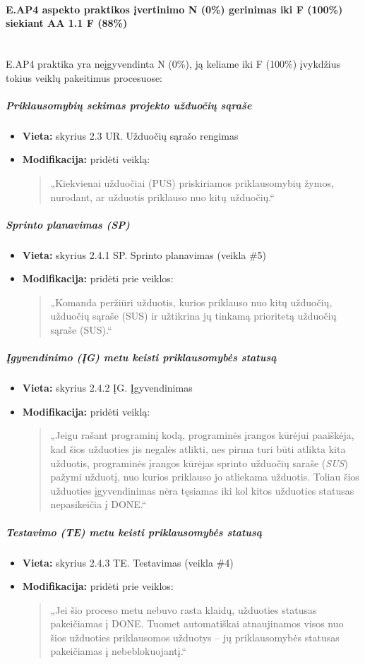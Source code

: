 \documentclass{article}
\newcommand{\subsubsubsection}[1]{\paragraph{#1}\mbox{}\\}
\begin{document}
\subsubsubsection{E.AP4 aspekto praktikos įvertinimo N (0\%) gerinimas iki F (100\%) siekiant AA 1.1 F (88\%)}

E.AP4 praktika yra neįgyvendinta N (0\%), ją keliame iki F (100\%) įvykdžius tokius veiklų pakeitimus procesuose:

\subparagraph{Priklausomybių sekimas projekto užduočių sąraše}
\begin{itemize}
    \item \textbf{Vieta:} skyrius 2.3 UR. Užduočių sąrašo rengimas
    \item \textbf{Modifikacija:} pridėti veiklą:
    \begin{quote}
        „Kiekvienai užduočiai (PUS) priskiriamos priklausomybių žymos, nurodant, ar užduotis priklauso nuo kitų užduočių.“
    \end{quote}
\end{itemize}

\subparagraph{Sprinto planavimas (SP)}
\begin{itemize}
    \item \textbf{Vieta:} skyrius 2.4.1 SP. Sprinto planavimas (veikla \#5)
    \item \textbf{Modifikacija:} pridėti prie veiklos:
    \begin{quote}
        „Komanda peržiūri užduotis, kurios priklauso nuo kitų užduočių, užduočių sąraše (SUS) ir užtikrina jų tinkamą prioritetą užduočių sąraše (SUS).“
    \end{quote}
\end{itemize}

\subparagraph{Įgyvendinimo (ĮG) metu keisti priklausomybės statusą}
\begin{itemize}
    \item \textbf{Vieta:} skyrius 2.4.2 ĮG. Įgyvendinimas
    \item \textbf{Modifikacija:} pridėti veiklą:
    \begin{quote}
        „Jeigu rašant programinį kodą, programinės įrangos kūrėjui paaiškėja, kad šios užduoties jis negalės atlikti, nes pirma turi būti atlikta kita užduotis, programinės įrangos kūrėjas sprinto užduočių saraše (\textit{SUS}) pažymi užduotį, nuo kurios priklauso jo atliekama užduotis. Toliau šios užduoties įgyvendinimas nėra tęsiamas iki kol kitos užduoties statusas nepasikeičia į DONE.“
    \end{quote}
\end{itemize}

\subparagraph{Testavimo (TE) metu keisti priklausomybės statusą}
\begin{itemize}
    \item \textbf{Vieta:} skyrius 2.4.3 TE. Testavimas (veikla \#4)
    \item \textbf{Modifikacija:} pridėti prie veiklos:
    \begin{quote}
        „Jei šio proceso metu nebuvo rasta klaidų, užduoties statusas pakeičiamas į DONE. Tuomet automatiškai atnaujinamos visos nuo šios užduoties priklausomos užduotys – jų priklausomybės statusas pakeičiamas į nebeblokuojantį.“
    \end{quote}
\end{itemize}
\end{document}

